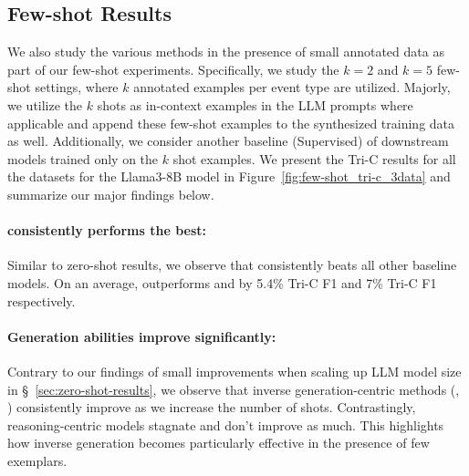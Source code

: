 \subsection{Few-shot Results}

We also study the various methods in the presence of small annotated data as part of our few-shot experiments.
Specifically, we study the $k=2$ and $k=5$ few-shot settings, where $k$ annotated examples per event type are utilized.
Majorly, we utilize the $k$ shots as in-context examples in the LLM prompts where applicable and append these few-shot examples to the synthesized training data as well.
Additionally, we consider another baseline (Supervised) of downstream models trained only on the $k$ shot examples.
We present the Tri-C results for all the datasets for the Llama3-8B model in Figure~\ref{fig:few-shot_tri-c_3data} and summarize our major findings below.

\paragraph{\modelName{} consistently performs the best:}
Similar to zero-shot results, we observe that \modelName{} consistently beats all other baseline models.
On an average, \modelName{} outperforms \starName{} and \extracttrain{} by 5.4\% Tri-C F1 and 7\% Tri-C F1 respectively.

\paragraph{Generation abilities improve significantly:}
Contrary to our findings of small improvements when scaling up LLM model size in \S~\ref{sec:zero-shot-results}, we observe that inverse generation-centric methods (\starName, \modelName{}) consistently improve as we increase the number of shots.
Contrastingly, reasoning-centric models stagnate and don't improve as much.
This highlights how inverse generation becomes particularly effective in the presence of few exemplars.

